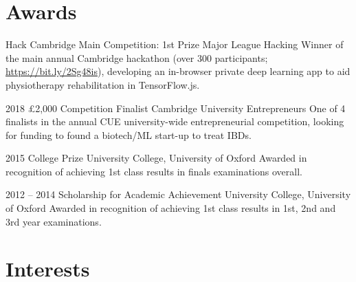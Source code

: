 \documentclass[]{friggeri-cv} %
\begin{document}
\begin{entrylist}
{\begin{itemize}
\end{itemize}}






\end{entrylist}

\pagebreak
\section{Awards}

\begin{entrylist}
	
    {Hack Cambridge Main Competition: 1st Prize}
    {Major League Hacking}
    {Winner of the main annual Cambridge hackathon (over 300 participants; \url{https://bit.ly/2Sg48is}), developing an in-browser private deep learning app to aid physiotherapy rehabilitation in TensorFlow.js.}
	
    \entrysmall
    {2018}
    {£2,000 Competition Finalist}
    {Cambridge University Entrepreneurs}
    {One of 4 finalists in the annual CUE university-wide entrepreneurial competition, looking for
    funding to found a biotech/ML start-up to treat IBDs.}
    
	\entrysmall
	{2015}
	{College Prize}
	{University College, University of Oxford}
	{Awarded in recognition of achieving 1st class results in finals examinations overall.}
    	
	\entrysmall
	{2012 -- 2014}
	{Scholarship {\normalfont for Academic Achievement}}
	{University College, University of Oxford}
	{Awarded in recognition of achieving 1st class results in 1st, 2nd and 3rd year examinations.}

	
	
\end{entrylist}


\section{Interests}
\end{document}
